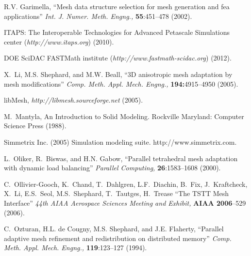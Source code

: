 \begin{thebibliography}{99}

R.V. Garimella, ``Mesh data structure selection for mesh generation and fea applications'' {\it Int. J. Numer. Meth. Engng.,} {\bf 55}:451--478 (2002).


 ITAPS: The Interoperable Technologies for Advanced Petascale Simulations center ({\it http://www.itaps.org}) (2010). 

 DOE SciDAC FASTMath institute ({\it http://www.fastmath-scidac.org}) (2012).


X.~Li, M.S. Shephard, and M.W. Beall, ``3D anisotropic mesh adaptation by mesh modifications'' {\it Comp. Meth. Appl. Mech. Engng.,} {\bf 194:}4915--4950 (2005).

{libMesh}, {\it http://libmesh.sourceforge.net} (2005).


M.~Mantyla, An Introduction to Solid Modeling. Rockville Maryland: Computer Science Press (1988).

 Simmetrix Inc. (2005) Simulation modeling suite.
http://www.simmetrix.com.

L.~Oliker, R.~Biswas, and H.N. Gabow, ``Parallel tetrahedral mesh adaptation with dynamic load balancing'' {\it Parallel Computing,} {\bf 26}:1583--1608 (2000).

C.~Ollivier-Gooch, K.~Chand, T.~Dahlgren, L.F.~Diachin, B.~Fix, J.~Kraftcheck, X.~Li, E.S.~Seol, M.S.~Shephard, T.~Tautges, H.~Trease ``The TSTT Mesh Interface'' {\it 44th AIAA Aerospace Sciences Meeting and Exhibit,} {\bf AIAA 2006}--529 (2006).

C.~Ozturan, H.L. de Cougny, M.S. Shephard, and J.E. Flaherty, ``Parallel adaptive mesh refinement and redistribution on distributed memory'' {\it Comp. Meth. Appl. Mech. Engng.,} {\bf 119}:123--127 (1994).


\end{thebibliography}
